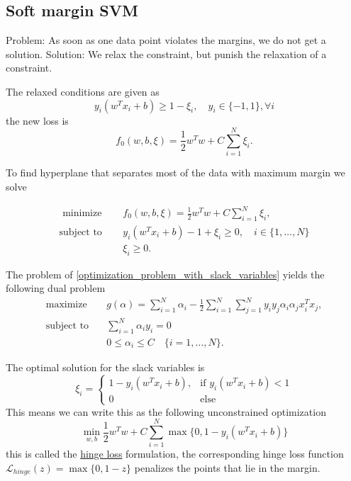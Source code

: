 \documentclass[12 pt]{article}        	%
\begin{document}
\subsection{Soft margin SVM}
    
Problem: As soon as one data point violates the margins, we do not get a solution.
Solution: We relax the constraint, but punish the relaxation of a constraint.

The relaxed conditions are given as 
\[
    y_i ( w^T x_i + b ) \geq 1 - \xi_i, \quad y_i \in \{ -1 , 1 \}, \forall i
\]
the new loss is 
\[
    f_0 ( w , b , \xi ) 
    =
    \frac{ 1 }{ 2 } w^T w + C \sum_{ i = 1 }^N \xi_i .
\]

\begin{defi}
    \label{optimization_problem_with_slack_variables}

    To find hyperplane that separates most of the data with maximum margin we solve
    
    \begin{align*}
        \text{ minimize } \quad &f_0 ( w , b , \xi ) 
        = \frac{1}{2} w^Tw + C \sum_{ i = 1 }^N \xi_i,
        \\
        \text{subject to} \quad &y_i ( w^T x_i + b ) - 1 + \xi_i \geq 0, \quad i \in \{ 1, \dotsc , N \}
        \\
        & \xi_i \geq 0.
    \end{align*}
\end{defi}

\begin{lem}
    The problem of \cref{optimization_problem_with_slack_variables} yields the following dual problem
    \begin{align*}
        \text{maximize} \quad &g ( \alpha ) = \sum_{ i = 1 }^N \alpha_i 
        - 
        \frac{ 1 }{ 2 } \sum_{ i = 1 }^N \sum_{ j = 1 }^N y_i y_j \alpha_i \alpha_j x_i^T x_j,
        \\
        \text{subject to} \quad &\sum_{ i = 1 }^N \alpha_i y_i = 0 
        \\
        &0 \leq \alpha_i \leq C \quad \{ i = 1 , \dotsc , N \}.
    \end{align*}

    The optimal solution for the slack variables is 
    \[
        \xi_i = 
        \begin{cases}
            1 - y_i ( w^T x_i + b ), & \text{if } y_i ( w^T x_i + b ) < 1 
            \\
            0 & \text{else}
        \end{cases}
    \]
    This means we can write this as the following unconstrained optimization
    \[
        \min_{ w , b } \frac{ 1 }{ 2 } w^T w + C \sum_{ i = 1 }^N 
        \max \{ 0 , 1 - y_i ( w^T x_i + b ) \}
    \]
    this is called the \underline{hinge loss} formulation, the corresponding hinge loss function $ \mathcal{ L }_{ hinge } ( z ) = \max \{ 0 , 1 - z \} $ penalizes the points that lie in the margin.
\end{lem}
\end{document}
